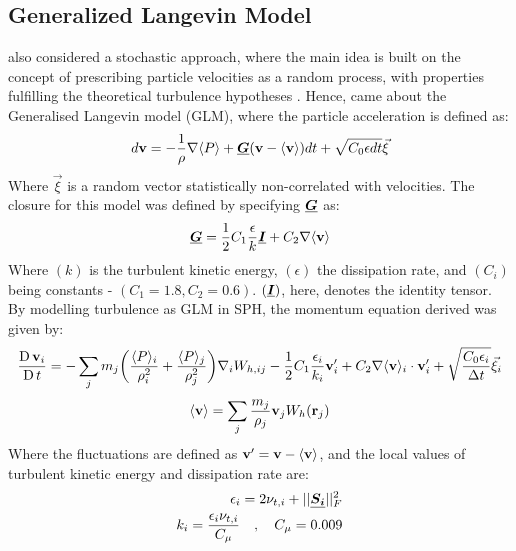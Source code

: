\subsection{Generalized Langevin Model}
\cite{VIOLEAU2002} also considered a stochastic approach, where the main idea is built on the concept of prescribing particle velocities as a random process, with properties fulfilling the theoretical turbulence hypotheses \parencite{pope1994lagrangi}. Hence, came about the Generalised Langevin model (GLM), where the particle acceleration is defined as:
\begin{equation}
    d\mathbf{v} = -\frac{1}{\rho} \nabla \langle P \rangle + \underline{\bm{G}}(\mathbf{v} - \langle \mathbf{v} \rangle)dt + \sqrt{C_0 \epsilon dt}\Vec{\xi}
    \label{eq:violeau-glm-particle-accel}
\end{equation}
Where $\Vec{\xi}$ is a random vector statistically non-correlated with velocities. The closure for this model was defined by specifying $\underline{\bm{G}}$ as:
\begin{equation}
    \underline{\bm{G}} = \frac{1}{2} C_1 \frac{\epsilon}{k}\underline{\bm{I}} + C_2 \nabla \langle \mathbf{v} \rangle
\end{equation}
Where $(k)$ is the turbulent kinetic energy, $(\epsilon)$ the dissipation rate, and $(C_i)$ being constants - $(C_1=1.8, C_2=0.6)$. $(\underline{\bm{I}})$, here, denotes the identity tensor.
By modelling turbulence as GLM in SPH, the momentum equation derived was given by:
\begin{equation}
    \frac{\operatorname{D} \mathbf{v}_i}{\operatorname{D} t} = -\sum_j m_j \bigg( \frac{\langle P \rangle_i}{\rho_i^2} + \frac{\langle P \rangle_j}{\rho_j^2} \bigg) \nabla_{i} W_{h, ij} - \frac{1}{2} C_1 \frac{\epsilon_i}{k_i} \mathbf{v}'_i + C_2 \nabla \langle \mathbf{v} \rangle_i \cdot \mathbf{v}'_i + \sqrt{\frac{C_0 \epsilon_i}{\Delta t}} \Vec{\xi}_i
    \label{eq:violeau-mom-glm}
\end{equation}
\begin{equation}
    \langle \mathbf{v} \rangle = \sum_j \frac{m_j}{\rho_j}\mathbf{v}_j W_h (\mathbf{r}_j)
    \label{eq:violeau-ra-vel}
\end{equation}
Where the fluctuations are defined as $\mathbf{v}' = \mathbf{v} - \langle \mathbf{v} \rangle$, and the local values of turbulent kinetic energy and dissipation rate are:
\begin{align}
    \epsilon_i = 2 \nu_{t, i} + 
    ||\underline{\bm{S_i}}||_F^2 \\
    k_i = \frac{\epsilon_i \nu_{t, i}}{C_{\mu}} \quad , \quad C_{\mu} = 0.009
    \label{eq:violeau-k-eps}
\end{align}

